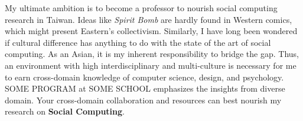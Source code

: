 \noindent
My ultimate ambition is to become a professor to nourish social computing research in Taiwan.
Ideas like \textit{Spirit Bomb} are hardly found in Western comics, which might present Eastern's collectivism.
Similarly, I have long been wondered if cultural difference has anything to do with the state of the art of social computing. 
As an Asian, it is my inherent responsibility to bridge the gap.
Thus, an environment with high interdisciplinary and multi-culture is necessary
for me to earn cross-domain knowledge of computer science, design, and psychology.
SOME PROGRAM at SOME SCHOOL emphasizes the insights from diverse domain. 
Your cross-domain collaboration and resources can best nourish my research on \textbf{Social Computing}.\\



